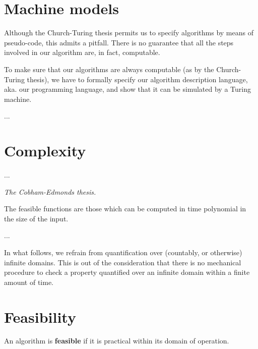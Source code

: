 \section{Machine models}

Although the Church-Turing thesis permits us to specify algorithms by means of
pseudo-code, this admits a pitfall. There is no guarantee that all the steps
involved in our algorithm are, in fact, computable.

To make sure that our algorithms are always computable (as by the Church-Turing
thesis), we have to formally specify our algorithm description language, aka.
our programming language, and show that it can be simulated by a Turing
machine.

...





\section{Complexity}

...

\begin{notion} \emph{The Cobham-Edmonds thesis.}

The feasible functions are those which can be computed in time polynomial in
the size of the input.

\end{notion}

...


In what follows, we refrain from quantification over (countably, or otherwise)
infinite domains. This is out of the consideration that there is no mechanical
procedure to check a property quantified over an infinite domain within a
finite amount of time.

\section{Feasibility}

\begin{notion} An algorithm is \textbf{feasible} if it is practical within its
domain of operation. \end{notion}

